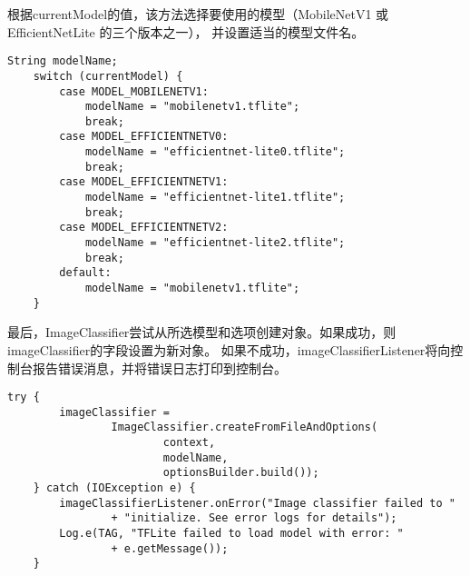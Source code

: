 根据currentModel的值，该方法选择要使用的模型（MobileNetV1 或 EfficientNetLite 的三个版本之一），
并设置适当的模型文件名。
\begin{lstlisting}[style=code]
    String modelName;
    switch (currentModel) {
        case MODEL_MOBILENETV1:
            modelName = "mobilenetv1.tflite";
            break;
        case MODEL_EFFICIENTNETV0:
            modelName = "efficientnet-lite0.tflite";
            break;
        case MODEL_EFFICIENTNETV1:
            modelName = "efficientnet-lite1.tflite";
            break;
        case MODEL_EFFICIENTNETV2:
            modelName = "efficientnet-lite2.tflite";
            break;
        default:
            modelName = "mobilenetv1.tflite";
    }
\end{lstlisting}

最后，ImageClassifier尝试从所选模型和选项创建对象。如果成功，则imageClassifier的字段设置为新对象。
如果不成功，imageClassifierListener将向控制台报告错误消息，并将错误日志打印到控制台。
\begin{lstlisting}[style=code]
    try {
        imageClassifier =
                ImageClassifier.createFromFileAndOptions(
                        context,
                        modelName,
                        optionsBuilder.build());
    } catch (IOException e) {
        imageClassifierListener.onError("Image classifier failed to "
                + "initialize. See error logs for details");
        Log.e(TAG, "TFLite failed to load model with error: "
                + e.getMessage());
    }
\end{lstlisting}




